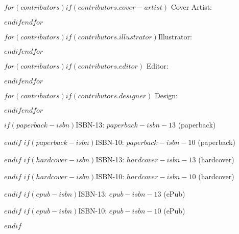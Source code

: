     \begin{center}

      $for(contributors)$$if(contributors.cover-artist)$ Cover Artist: \coverartist \par$endif$$endfor$

      $for(contributors)$$if(contributors.illustrator)$\noindent Illustrator: \illustrator \par$endif$$endfor$
      
      $for(contributors)$$if(contributors.editor)$ Editor: \editor \par$endif$$endfor$
      
      $for(contributors)$$if(contributors.designer)$ Design: \designer \par$endif$$endfor$
   
      \vspace{0.4cm}
      
  $if(paperback-isbn)$\noindent ISBN-13: {$paperback-isbn-13$} (paperback) \par $endif$
  $if(paperback-isbn)$\noindent ISBN-10: {$paperback-isbn-10$} (paperback) \par $endif$
  $if(hardcover-isbn)$\noindent ISBN-13: {$hardcover-isbn-13$} (hardcover) \par $endif$
  $if(hardcover-isbn)$\noindent ISBN-10: {$hardcover-isbn-10$} (hardcover) \par $endif$
  $if(epub-isbn)$\noindent ISBN-13: {$epub-isbn-13$} (ePub) \par $endif$
  $if(epub-isbn)$\noindent ISBN-10: {$epub-isbn-10$} (ePub) \par $endif$
      
    \end{center}
    
\clearpage